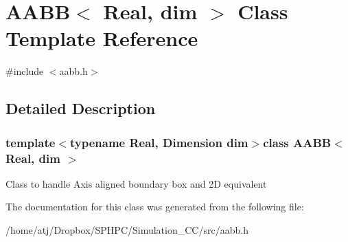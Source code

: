 \hypertarget{classAABB}{}\section{A\+A\+B\+B$<$ Real, dim $>$ Class Template Reference}
\label{classAABB}


{\ttfamily \#include $<$aabb.\+h$>$}



\subsection{Detailed Description}
\subsubsection*{template$<$typename Real, Dimension dim$>$class A\+A\+B\+B$<$ Real, dim $>$}

Class to handle Axis aligned boundary box and 2\+D equivalent 

The documentation for this class was generated from the following file\+:\begin{DoxyCompactItemize}
\item 
/home/atj/\+Dropbox/\+S\+P\+H\+P\+C/\+Simulation\+\_\+\+C\+C/src/aabb.\+h\end{DoxyCompactItemize}
